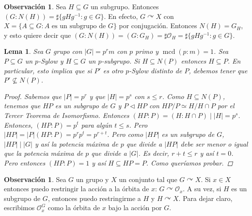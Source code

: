 \documentclass[12pt]{book}
\newtheorem{lem}[teo]{Lema}
\theoremstyle{definition}
\newtheorem{obs}[teo]{Observación}
\DeclareMathOperator{\mcd}{mcd}
\def\acts{\curvearrowright}
\begin{document}
\begin{obs}
Sea $H\subseteq G$ un subgrupo. Entonces $(G:N(H)) = \sharp \{gHg^{-1} : g\in G\}$. En efecto, $G\acts X$ con $X=\{A\subseteq G : A \text{ es un subgrupo de } G\}$ por conjugación. Entonces $N(H) = G_H$, y esto quiere decir que $(G:N(H))=(G:G_H)=\sharp \mathcal{O}_H = \sharp \{gHg^{-1} : g\in G\}$.
\end{obs}

\begin{lem}
Sea $G$ grupo con $|G| = p^r m $ con $p$ primo y $\mcd (p:m) = 1$. Sea $P\subseteq G$ un $p$-Sylow y $H\subseteq G$ un $p$-subgrupo. Si $H\subseteq N(P)$ entonces $H\subseteq P$. En particular, esto implica que si $P'$ es otro $p$-Sylow distinto de $P$, debemos tener que $P'\not\subseteq N(P)$.
\begin{proof}
Sabemos que $|P|=p^r$ y que $|H| = p^s$ con $s\leq r$. Como $H\subseteq N(P)$, tenemos que $HP$ es un subgrupo de $G$ y $P\triangleleft HP$ con $HP/P\simeq H/H\cap P$ por el Tercer Teorema de Isomorfismo. Entonces $(HP:P) = (H:H\cap P) \mid |H| = p^s$. Entonces, $(HP:P)=p^t$ para algún $t\leq s$. Pero $|HP| = |P|(HP:P) = p^r p^t = p^{r+t}$. Pero como $|HP|$ es un subgrupo de $G$, $|HP| \mid |G|$ y así la potencia máxima de $p$ que divide a $|HP|$ debe ser menor o igual que la potencia máxima de $p$ que divide a $|G|$. Es decir, $r+t\leq r$ y así $t=0$. Pero entonces $(HP:P)=1$ y así $H\subseteq HP = P$. Como queríamos probar.
\end{proof}
\end{lem}

\begin{obs}
Sea $G$ un grupo y $X$ un conjunto tal que $G\acts X$. Si $x\in X$ entonces puedo restringir la acción a la órbita de $x$: $G\acts \mathcal{O}_x$. A su vez, si $H$ es un subgrupo de $G$, entonces puedo restringirme a $H$ y $H\acts X$. Para dejar claro, escribimos $\mathcal{O}_x^G$ como la órbita de $x$ bajo la acción por $G$.
\end{obs}
\end{document}
